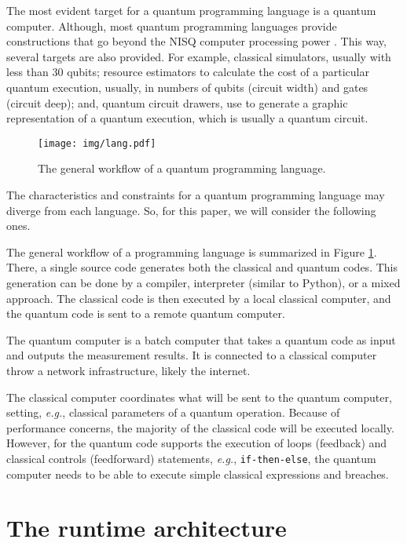 \documentclass[preprint,3p,times,twocolumn]{elsarticle}
\begin{document}
The most evident target for a quantum programming language is a quantum
computer. Although, most quantum programming languages provide constructions
that go beyond the NISQ computer processing power \cite{Svore2006, Green2013}.
This way, several targets are also provided. For example, classical simulators,
usually with less than 30 qubits; resource estimators to calculate the cost of
a particular quantum execution, usually, in numbers of qubits (circuit width)
and gates (circuit deep); and, quantum circuit drawers, use to generate a
graphic representation of a quantum execution, which is usually a quantum
circuit.

\begin{figure}[h]
    \centering
    \texttt{[image: img/lang.pdf]}
    \caption{The general workflow of a quantum programming language.}
    \label{fig:lang}
\end{figure}

The characteristics and constraints for a quantum programming language may
diverge from each language. So, for this paper, we will consider the following
ones.

The general workflow of a programming language is summarized in Figure
\ref{fig:lang}.  There, a single source code generates both the classical and
quantum codes.  This generation can be done by a compiler, interpreter (similar
to Python), or a mixed approach. The classical code is then executed by a local
classical computer, and the quantum code is sent to a remote quantum computer.

The quantum computer is a batch computer that takes a quantum code as input and
outputs the measurement results. It is connected to a classical computer
throw a network infrastructure, likely the internet. 

The classical computer coordinates what will be sent to the quantum computer,
setting, \textit{e.g.}, classical parameters of a quantum operation. Because of
performance concerns, the majority of the classical code will be executed
locally.  However, for the quantum code supports the execution of loops
(feedback) and classical controls (feedforward) statements, \textit{e.g.},
\texttt{if-then-else}, the quantum computer needs to be able to execute simple
classical expressions and breaches.

\section{The runtime architecture}
\label{sec:runtime}
\end{document}

